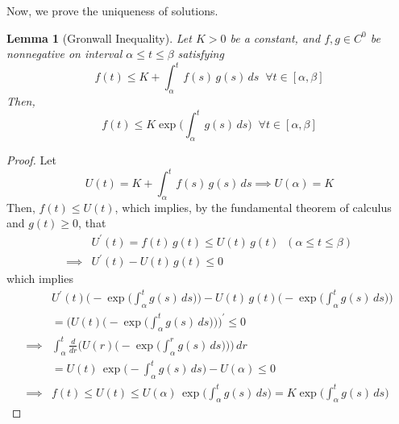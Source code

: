 \documentclass{article}
\newtheorem{lemma}[theorem]{Lemma}
\theoremstyle{remark}
\theoremstyle{definition}
\begin{document}
    Now, we prove the uniqueness of solutions. 
    \begin{lemma}[Gronwall Inequality]
    Let $K > 0$ be a constant, and $f, g \in C^0$ be nonnegative on interval $\alpha \leq t \leq \beta$ satisfying 
    \[f(t) \leq K + \int_\alpha^t f(s)\,g(s) \,ds \;\; \forall t \in [\alpha, \beta]\]
    Then, 
    \[f(t) \leq K \exp \bigg( \int_{\alpha}^t g(s) \,ds \bigg) \;\; \forall t \in [\alpha, \beta]\]
    \end{lemma}
    \begin{proof}
    Let 
    \[U(t) = K + \int_\alpha^t f(s) \, g(s) \, ds \implies U (\alpha) = K\]
    Then, $f(t) \leq U(t)$, which implies, by the fundamental theorem of calculus and $g(t) \geq 0$, that 
    \begin{align*}
        & U^\prime (t) = f(t)\,g(t) \leq U(t) \, g(t) \;\; (\alpha \leq t \leq \beta) \\
        \implies & U^\prime (t) - U(t) \, g(t) \leq 0
    \end{align*}
    which implies
    \begin{align*}
        & U^\prime (t) \bigg( - \exp \Big( \int_\alpha^t g(s) \, ds \Big)\bigg) - U(t) \, g(t) \bigg( - \exp \Big( \int_\alpha^t g(s) \, ds \Big)\bigg) \\
        & = \Bigg( U(t) \bigg( - \exp \Big( \int_\alpha^t g(s) \, ds \Big)\bigg) \Bigg)^\prime \leq 0 \\
        \implies & \int_\alpha^t \frac{d}{dr} \bigg( U(r) \bigg( - \exp \Big( \int_\alpha^r g(s) \, ds \Big)\bigg) \bigg) \,dr \\
        & = U(t) \, \exp \Big( -\int_\alpha^t g(s)\,ds \Big) - U(\alpha) \leq 0 \\
        \implies & f(t) \leq U(t) \leq U(\alpha) \, \exp \Big( \int_\alpha^t g(s)\,ds \Big) = K \exp \Big( \int_\alpha^t g(s) \, ds\Big) 
    \end{align*}
    \end{proof}
\end{document}
